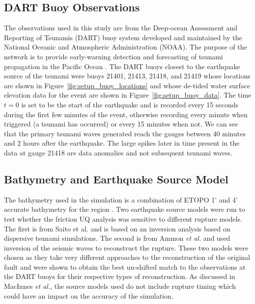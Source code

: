 \subsection{DART Buoy Observations}

The observations used in this study are from the Deep-ocean Assessment and
Reporting of Tsunamis (DART) buoy system developed and maintained by the
National Oceanic and Atmospheric Administration (NOAA).  The purpose of the
network is to provide early-warning detection and forecasting of tsunami
propagation in the Pacific Ocean \cite{Milburn:1996wm}.  The DART buoys closest
to the earthquake source of the \tohoku tsunami were buoys 21401, 21413, 21418,
and 21419 whose locations are shown in Figure~\ref{fig:setup_buoy_locations} and
whose de-tided water surface elevation data for the event are shown in
Figure~\ref{fig:setup_buoy_data}. The time $t=0$ is set to be the start of the
earthquake and is recorded every 15 seconds during the first few minutes of the
event, otherwise recording every minute when triggered (a tsunami has occurred)
or every 15 minutes when not.  We can see that the primary tsunami
waves generated reach the gauges between 40 minutes and 2 hours after the
earthquake.  The large spikes later in time present in the data at gauge 21418
are data anomalies and not subsequent tsunami waves.

\subsection{Bathymetry and Earthquake Source Model}

The bathymetry used in the simulation is a combination of ETOPO 1' and 4'
accurate bathymetry for the region \cite{Amante:2009ud}.    
Two earthquake source models were run to test whether the friction UQ analysis
was sensitive to different rupture models. The first is from Saito et al.
\cite{Saito:2011bh} and is based on an inversion analysis based on dispersive
tsunami simulations.  The second is from Ammon \emph{et al.} \cite{Ammon:2011dm} and
used inversion of the seismic waves to reconstruct the rupture.  These two
models were chosen as they take very different approaches to the reconstruction
of the original fault and were shown to obtain the best un-shifted match to the
observations at the DART buoys for their respective types of reconstruction.  As
discussed in MacInnes \emph{et al.}, the source models used do not include rupture
timing which could have an impact on the accuracy of the simulation.

